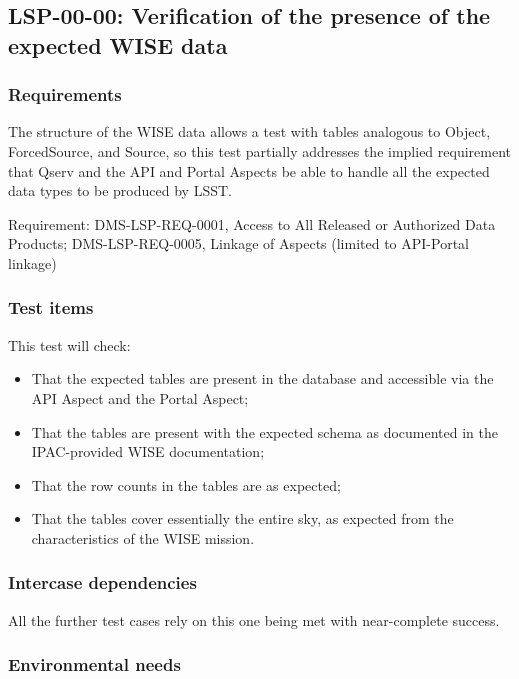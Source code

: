 \subsection{LSP-00-00: Verification of the presence of the expected WISE data}
\label{lsp-00-00}

\subsubsection{Requirements}

The structure of the WISE data allows a test with tables analogous to Object, ForcedSource, and Source, 
so this test partially addresses the implied requirement that Qserv and the API and Portal Aspects be able to handle all the expected data types to be produced by LSST.

Requirement: DMS-LSP-REQ-0001, Access to All Released or Authorized Data Products; DMS-LSP-REQ-0005, Linkage of Aspects (limited to API-Portal linkage)

\subsubsection{Test items}

This test will check:

\begin{itemize}

  \item{That the expected tables are present in the database and accessible via the API Aspect and the Portal Aspect;}
  \item{That the tables are present with the expected schema as documented in the IPAC-provided WISE documentation;}
  \item{That the row counts in the tables are as expected;}
  \item{That the tables cover essentially the entire sky, as expected from the characteristics of the WISE mission.}

\end{itemize}

\subsubsection{Intercase dependencies}

All the further test cases rely on this one being met with near-complete success.

\subsubsection{Environmental needs}

